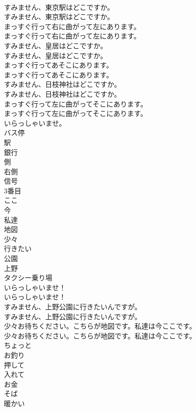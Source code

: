 \documentclass[8pt]{extreport}
\begin{document}
\begin{CJK}{UTF8}{min}
\\	すみません、東京駅はどこですか。	
\\	すみません、東京駅はどこですか。 
\\	まっすぐ行って右に曲がって左にあります。	
\\	まっすぐ行って右に曲がって左にあります。 
\\	すみません、皇居はどこですか。	
\\	すみません、皇居はどこですか。 
\\	まっすぐ行ってあそこにあります。	
\\	まっすぐ行ってあそこにあります。 
\\	すみません、日枝神社はどこですか。	
\\	すみません、日枝神社はどこですか。 
\\	まっすぐ行って左に曲がってそこにあります。	
\\	まっすぐ行って左に曲がってそこにあります。 
\\	いらっしゃいませ。
\\	バス停
\\	駅
\\	銀行
\\	側
\\	右側
\\	信号
\\	3番目
\\	ここ
\\	今
\\	私達
\\	地図
\\	少々
\\	行きたい
\\	公園
\\	上野
\\	タクシー乗り場
\\	いらっしゃいませ！	
\\	いらっしゃいませ！ 
\\	すみません、上野公園に行きたいんですが。	
\\	すみません、上野公園に行きたいんですが。 
\\	少々お待ちください。こちらが地図です。私達は今ここです。	
\\	少々お待ちください。こちらが地図です。私達は今ここです。 
\\	ちょっと
\\	お釣り
\\	押して
\\	入れて
\\	お金
\\	そば
\\	暖かい

\end{CJK}
\end{document}
